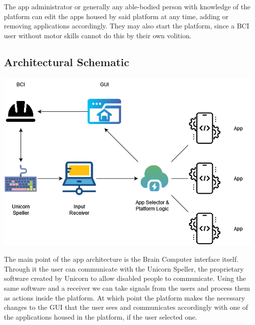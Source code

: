 \hspace{\parindent} The app administrator or generally any able-bodied person with knowledge of the platform can edit the apps housed by said platform at any time, adding or removing applications accordingly. They may also start the platform, since a BCI user without motor skills cannot do this by their own volition.


\subsection{Architectural Schematic}\label{subsect:architectural schematic}
\vspace{20pt}
\includegraphics[width = 420pt]{Diagrams/Architectural.png}

\vspace{5pt}
\vspace{25pt}

\hspace{\parindent} The main point of the app architecture is the Brain Computer interface itself. Through it the user can communicate with the Unicorn Speller, the proprietary software created by Unicorn to allow disabled people to communicate. Using the same software and a receiver we can take signals from the users and process them as actions inside the platform. At which point the platform makes the necessary changes to the GUI that the user sees and communicates accordingly with one of the applications housed in the platform, if the user selected one.


